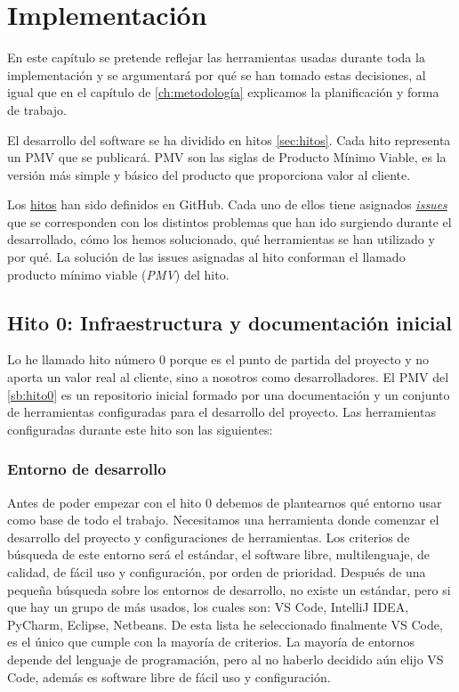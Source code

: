\UseRawInputEncoding
\chapter{Implementación}

En este capítulo se pretende reflejar las herramientas usadas durante toda la implementación y
se argumentará por qué se han tomado estas decisiones, al igual que en el capítulo de \ref{ch:metodología} explicamos
la planificación y forma de trabajo.

El desarrollo del software se ha dividido en hitos \ref*{sec:hitos}. Cada hito representa un PMV que se publicará.
PMV son las siglas de Producto Mínimo Viable, es la versión más simple y básico del producto que proporciona valor al cliente.

Los \href{https://github.com/RubenDelgadoPareja/TFG-Triage-Inteligente-Consulta-Medica/milestones}{hitos} han sido definidos en GitHub.
Cada uno de ellos tiene asignados \href{https://github.com/RubenDelgadoPareja/TFG-Triage-Inteligente-Consulta-Medica/issues}{\textit{issues}} que se corresponden
con los distintos problemas que han ido surgiendo durante el desarrollado, cómo los hemos solucionado, qué herramientas se han utilizado y por qué.
La solución de las issues asignadas al hito conforman el llamado producto mínimo viable (\textit{PMV}) del hito.

\section{Hito 0: Infraestructura y documentación inicial}

Lo he llamado hito número 0 porque es el punto de partida del proyecto y no aporta un valor real al cliente, sino a nosotros como desarrolladores.
El PMV del \ref{sb:hito0} es un repositorio inicial formado por una documentación y un conjunto de herramientas configuradas para el desarrollo del proyecto.
Las herramientas configuradas durante este hito son las siguientes:

\subsection{Entorno de desarrollo}
Antes de poder empezar con el hito 0 debemos de plantearnos qué entorno usar como base de todo el trabajo.
Necesitamos una herramienta donde comenzar el desarrollo del proyecto y configuraciones de herramientas.
Los criterios de búsqueda de este entorno será el estándar, el software libre, multilenguaje, de calidad, de fácil uso y configuración, por orden de prioridad.
Después de una pequeña búsqueda sobre los entornos de desarrollo, no existe un estándar, pero si que hay un grupo de más usados, los cuales son: VS Code, IntelliJ IDEA, PyCharm, Eclipse, Netbeans.
De esta lista he seleccionado finalmente VS Code, es el único que cumple con la mayoría de criterios. La mayoría de entornos depende del lenguaje de programación, pero al no haberlo
decidido aún elijo VS Code, además es software libre de fácil uso y configuración.

